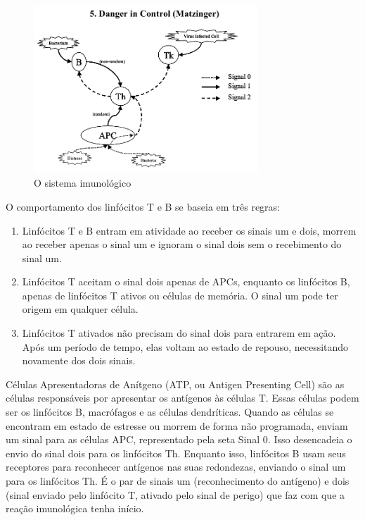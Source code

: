\documentclass{iiufrgs}
\begin{document}
\begin{figure}[h]
\centering
\includegraphics[width=0.75\textwidth]{img/signals5-danger.png}
\caption{O sistema imunológico}
\end{figure}

O comportamento dos linfócitos T e B se baseia em três regras:

\begin{enumerate}
\item Linfócitos T e B entram em atividade ao receber os sinais um e dois, morrem ao receber apenas o sinal um e ignoram o sinal dois sem o recebimento do sinal um.
\item Linfócitos T aceitam o sinal dois apenas de APCs, enquanto os linfócitos B, apenas de linfócitos T ativos ou células de memória. O sinal um pode ter origem em qualquer célula.
\item Linfócitos T ativados não precisam do sinal dois para entrarem em ação. Após um período de tempo, elas voltam ao estado de repouso, necessitando novamente dos dois sinais.
\end{enumerate}

Células Apresentadoras de Anítgeno (ATP, ou Antigen Presenting Cell) são as células responsáveis por apresentar os antígenos às células T. Essas células podem ser os linfócitos B, macrófagos e as células dendríticas. Quando as células se encontram em estado de estresse ou morrem de forma não programada, enviam um sinal para as células APC, representado pela seta Sinal 0. Isso desencadeia o envio do sinal dois para os linfócitos Th. Enquanto isso, linfócitos B usam seus receptores para reconhecer antígenos nas suas redondezas, enviando o sinal um para os linfócitos Th. É o par de sinais um (reconhecimento do antígeno) e dois (sinal enviado pelo linfócito T, ativado pelo sinal de perigo) que faz com que a reação imunológica tenha início.
\end{document}
